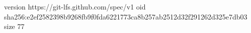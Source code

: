 version https://git-lfs.github.com/spec/v1
oid sha256:e2ef2582398b9268fb9f0fda6221773ca8b257ab2512d32f291262d325e7db03
size 77
